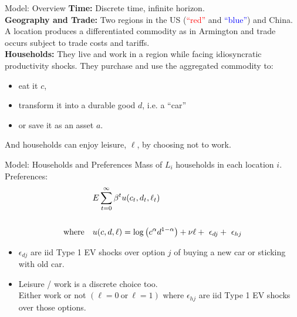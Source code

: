 \documentclass[9pt,pdftex,aspectratio=1610]{beamer}
\theoremstyle{definition}
\begin{document}

\begin{frame}[t]{Model: Overview}
\textbf{Time:} Discrete time, infinite horizon.\\
\bigskip
\textbf{Geography and Trade:} Two regions in the US (\textcolor{red}{``red''} and \textcolor{blue}{``blue''}) and China. A location produces a differentiated commodity as in Armington and trade occurs subject to trade costs and tariffs.\\
\bigskip
\textbf{Households:} They live and work in a region while facing idiosyncratic productivity shocks. They purchase and use the aggregated commodity to:\\
\begin{itemize}
\item eat it $c$,
\item transform it into a durable good $d$, i.e. a ``car''
\item or save it as an asset $a$.
\end{itemize}
\smallskip
And households can enjoy leisure, $\ell$, by choosing not to work.
\end{frame}



\begin{frame}[t]{Model: Households and Preferences}
\medskip
Mass of $L_i$ households in each location $i$.\\
\medskip
Preferences:
\begin{align*}
\small
& E \sum_{t = 0}^{\infty} \beta^{t} u(c_{t},d_{t}, \ell_{t})\\
\\
\mbox{where}  \ \ \ & u(c,d,\ell) =  \log \left( c^{\alpha}d^{1-\alpha}  \right) + \nu \ell + \ \epsilon_{dj} + \ \epsilon_{hj} \label{eq:utility-nols}
\end{align*}
\medskip
\begin{itemize}
\item $\epsilon_{dj}$ are iid Type 1 EV shocks over option $j$ of buying a new car or sticking with old car.
\medskip
\item Leisure / work is a discrete choice too.\\
\smallskip
Either work or not $(\ell = 0 \ \mbox{or} \ \ell = 1)$ where $\epsilon_{hj}$ are iid Type 1 EV shocks over those options.
\end{itemize}
\end{frame}
\end{document}
